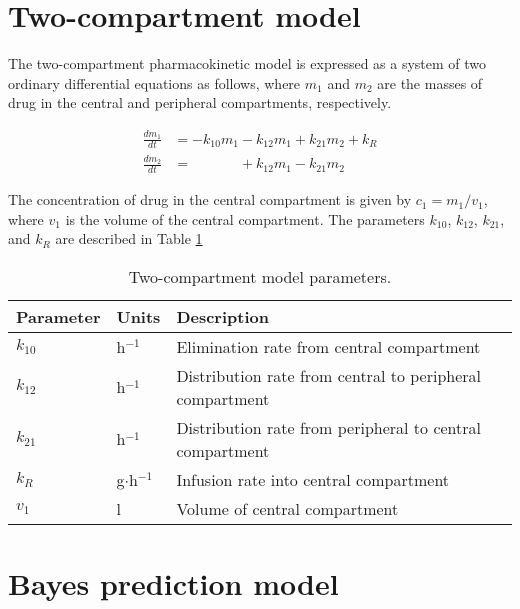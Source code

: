 \documentclass{article}
\begin{document}
\section{Two-compartment model}
The two-compartment pharmacokinetic model is expressed as a system of two ordinary differential equations as follows, where $m_1$ and $m_2$ are the masses of drug in the central and peripheral compartments, respectively.

\begin{align}
\frac{dm_1}{dt} &= -k_{10}m_1 - k_{12}m_1 + k_{21}m_2 + k_R \nonumber \\
\frac{dm_2}{dt} &= \phantom{-k_{10}m_1} + k_{12}m_1 - k_{21}m_2 \nonumber
\end{align}

The concentration of drug in the central compartment is given by $c_1 = m_1/v_1$, where $v_1$ is the volume of the central compartment. The parameters $k_{10}$, $k_{12}$, $k_{21}$, and $k_R$ are described in Table \ref{tab:pkpars}

\begin{table}
\begin{tabular}{lll} \hline
Parameter & Units & Description \\ \hline
$k_{10}$ & h$^{-1}$ & Elimination rate from central compartment\\
$k_{12}$ & h$^{-1}$ & Distribution rate from central to peripheral compartment\\
$k_{21}$ & h$^{-1}$ & Distribution rate from peripheral to central compartment\\
$k_R$  & g$\cdot$h$^{-1}$ & Infusion rate into central compartment\\
$v_1$  & l & Volume of central compartment\\
\hline
\end{tabular}
\caption{Two-compartment model parameters. \label{tab:pkpars}}
\end{table}

\section{Bayes prediction model}
\end{document}
